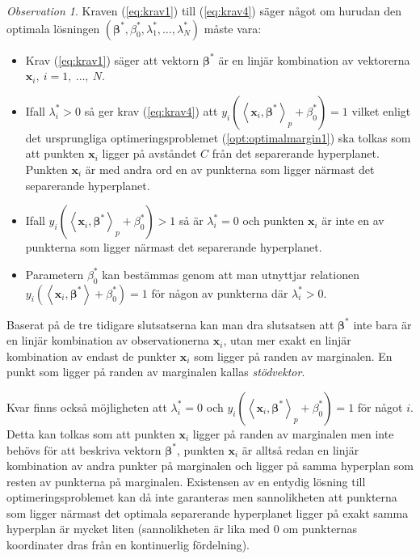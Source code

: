 \documentclass[a4paper, 12pt]{report}
\theoremstyle{definition}
\theoremstyle{remark}
\newtheorem*{rem}{Observation}
\newcommand{\bfbeta}{{\boldsymbol{\beta}}}
\newcommand{\bfx}{\mathbf{x}}
\newcommand{\llangle}{\left\langle}
\newcommand{\rrangle}{\right\rangle}
\newcommand{\inner}[2]{\llangle #1, #2 \rrangle}
\begin{document}
\begin{rem}
	Kraven (\ref{eq:krav1}) till (\ref{eq:krav4}) säger något om hurudan den optimala lösningen $\left(\bfbeta^*, \beta^*_0, \lambda_1^*, \dots, \lambda_N^*\right)$ måste vara:
	\begin{itemize}
		\item Krav (\ref{eq:krav1}) säger att vektorn $\bfbeta^*$ är en linjär kombination av vektorerna $\mathbf{x}_i,~i=1,~\dots,~N$.
		\item Ifall $\lambda^*_i > 0$ så ger krav (\ref{eq:krav4}) att $y_i\left(\inner{\bfx_i}{\bfbeta^*}_p+\beta^*_0\right) = 1$ vilket enligt det ursprungliga optimeringsproblemet (\ref{opt:optimalmargin1}) ska tolkas som att punkten $\mathbf{x}_i$ ligger på avståndet $C$ från det separerande hyperplanet. Punkten $\mathbf{x}_i$ är med andra ord en av punkterna som ligger närmast det separerande hyperplanet.
		\item Ifall $y_i\left(\inner{\bfx_i}{\bfbeta^*}_p + \beta^*_0\right) > 1$ så är $\lambda^*_i = 0$ och punkten $\mathbf{x}_i$ är inte en av punkterna som ligger närmast det separerande hyperplanet.
		\item Parametern $\beta^*_0$ kan bestämmas genom att man utnyttjar relationen $y_i\left( \inner{\bfx_i}{\bfbeta^*} + \beta^*_0\right) = 1$ för någon av punkterna där $\lambda^*_i > 0$.
	\end{itemize}
	Baserat på de tre tidigare slutsatserna kan man dra slutsatsen att $\bfbeta^*$ inte bara är en linjär kombination av observationerna $\mathbf{x}_i$, utan mer exakt en linjär kombination av endast de punkter $\mathbf{x}_{i}$ som ligger på randen av marginalen. En punkt som ligger på randen av marginalen kallas \emph{stödvektor}.
\end{rem}

Kvar finns också möjligheten att $\lambda^*_i = 0$ och $y_i\left( \inner{\bfx_i}{\bfbeta^*}_p + \beta^*_0\right) = 1$ för något $i$.
Detta kan tolkas som att punkten $\bfx_i$ ligger på randen av marginalen men inte behövs för att beskriva vektorn $\bfbeta^*$, punkten $\bfx_i$ är alltså redan en linjär kombination av andra punkter på marginalen och ligger på samma hyperplan som resten av punkterna på marginalen.
Existensen av en entydig lösning till optimeringsproblemet kan då inte garanteras men sannolikheten att punkterna som ligger närmast det optimala separerande hyperplanet ligger på exakt samma hyperplan är mycket liten (sannolikheten är lika med 0 om punkternas koordinater dras från en kontinuerlig fördelning).
\newpage
\end{document}
